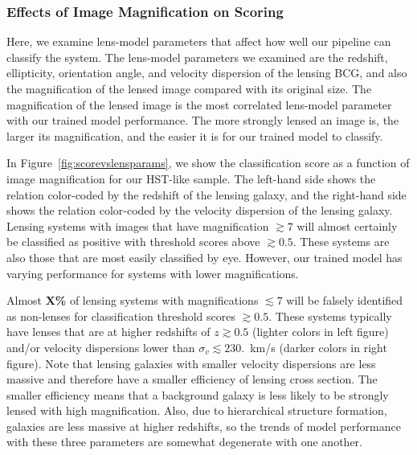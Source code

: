 \documentclass{emulateapj}
\newcommand{\todo}[1]{{\bf\color{blue} #1}}
\def\gsim{\gtrsim}
\def\lsim{\lesssim}
\begin{document}
\subsubsection{Effects of Image Magnification on Scoring}
\label{sec:peformance_lensmodel}

Here, we examine lens-model parameters that affect how well our
pipeline can classify the system.  The lens-model parameters we
examined are the redshift, ellipticity, orientation angle, and
velocity dispersion of the lensing BCG, and also the magnification of
the lensed image compared with its original size.  The magnification
of the lensed image is the most correlated lens-model parameter with
our trained model performance.  The more strongly lensed an image is,
the larger its magnification, and the easier it is for our trained
model to classify.

In Figure~\ref{fig:scorevslensparams}, we show the classification
score as a function of image magnification for our HST-like sample.
The left-hand side shows the relation color-coded by the redshift of
the lensing galaxy, and the right-hand side shows the relation
color-coded by the velocity dispersion of the lensing galaxy.  Lensing
systems with images that have magnification $\gsim7$ will almost
certainly be classified as positive with threshold scores above
$\gsim0.5$.  These systems are also those that are most easily
classified by eye.  However, our trained model has varying performance
for systems with lower magnifications.

Almost \todo{X\%} of lensing systems with magnifications $\lsim7$ will
be falsely identified as non-lenses for classification threshold
scores $\gsim0.5$.  These systems typically have lenses that are at
higher redshifts of $z\gsim0.5$ (lighter colors in left figure) and/or
velocity dispersions lower than $\sigma_v\lsim230.$~km/s (darker
colors in right figure).  Note that lensing galaxies with smaller
velocity dispersions are less massive and therefore have a smaller
efficiency of lensing cross section.  The smaller efficiency means
that a background galaxy is less likely to be strongly lensed with
high magnification.  Also, due to hierarchical structure formation,
galaxies are less massive at higher redshifts, so the trends of model
performance with these three parameters are somewhat degenerate with
one another.  
\end{document}
